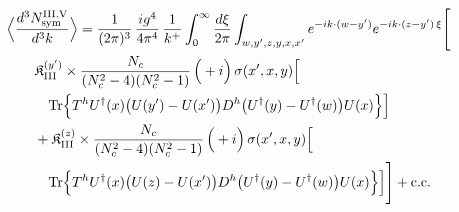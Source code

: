 \begingroup\small
\begin{align}\label{eq:S-III.V-3}
&\Big\langle\frac{d^{3}N^{\rm III.V}_{{\rm sym}}}{d^{3}k}\Big\rangle=\frac{1}{(2\pi)^{3}}\, \frac{ig^{4}}{4\pi^{4}}\, \frac{1}{k^{+}} \int_{0}^{\infty}\frac{d\xi}{2\pi} \int_{w,y',z,y,x,x'}e^{-ik\cdot(w-y')}e^{-ik\cdot(z-y')\,\xi}\Bigg[\notag\\
&\quad\quad \mathfrak{K}^{(y')}_{\rm III} \times \frac{N_{c}}{(N_{c}^{2}-4)(N_{c}^{2}-1)}\, \Big(+i\Big)\, \sigma(x',x,y)\Big[\notag\\
&\quad\quad\quad {\rm Tr}\Big\{T^{h}U^{\dagger}(x)\big(U(y')-U(x')\big)D^{h}\big(U^{\dagger}(y)-U^{\dagger}(w)\big)U(x)\Big\}\Big]\notag\\
&\quad\quad + \mathfrak{K}^{(z)}_{\rm III} \times \frac{N_{c}}{(N_{c}^{2}-4)(N_{c}^{2}-1)}\, \Big(+i\Big)\, \sigma(x',x,y)\Big[\notag\\
&\quad\quad\quad {\rm Tr}\Big\{T^{h}U^{\dagger}(x)\big(U(z)-U(x')\big)D^{h}\big(U^{\dagger}(y)-U^{\dagger}(w)\big)U(x)\Big\}\Big]\Bigg] +{\rm c.c.}
\end{align}
\endgroup
